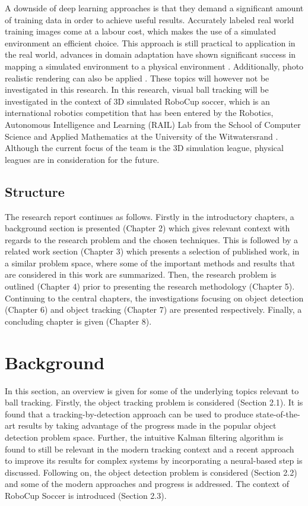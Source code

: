 \documentclass[a4paper,twoside,12pt]{report}
\begin{document}
A downside of deep learning approaches is that they demand a significant amount of training data in order to achieve useful results. Accurately labeled real world training images come at a labour cost, which makes the use of a simulated environment an efficient choice. This approach is still practical to application  in the real world, advances in domain adaptation have shown significant success in mapping a simulated environment to a physical environment \citep{domainadpt}. Additionally, photo realistic rendering can also be applied \citep{sim4cv}. These topics will however not be investigated in this research. In this research, visual ball tracking will be investigated in the context of 3D simulated RoboCup soccer, which is an international robotics competition  that has been entered by the Robotics, Autonomous Intelligence and Learning (RAIL) Lab from the School of Computer Science and Applied Mathematics at the University of the Witwatersrand \citep{witsfc}. Although the current focus of the team is the 3D simulation league, physical leagues are in consideration for the future. 

\section{Structure}

The research report continues as follows. Firstly in the introductory chapters, a background section is presented (Chapter 2) which gives relevant context with regards to the research problem and the chosen techniques. This is followed by a related work section (Chapter 3) which presents a selection of published work, in a similar problem space, where some of the important methods and results that are considered in this work are summarized. Then, the research problem is outlined (Chapter 4) prior to presenting the research methodology (Chapter 5). Continuing to the central chapters, the investigations focusing on object detection (Chapter 6) and object tracking (Chapter 7) are presented respectively. Finally, a concluding chapter is given (Chapter 8).

\chapter{Background}

In this section, an overview is given for some of the underlying topics relevant to ball tracking. Firstly, the object tracking problem is considered (Section 2.1). It is found that a tracking-by-detection approach can be used to produce state-of-the-art results by taking advantage of the progress made in the popular object detection problem space. Further, the intuitive Kalman filtering algorithm is found to still be relevant in the modern tracking context and a recent approach to improve its results for complex systems by incorporating a neural-based step is discussed. Following on, the object detection problem is considered  (Section 2.2) and some of the modern approaches and progress is addressed. The context of RoboCup Soccer is introduced (Section 2.3).
\end{document}
